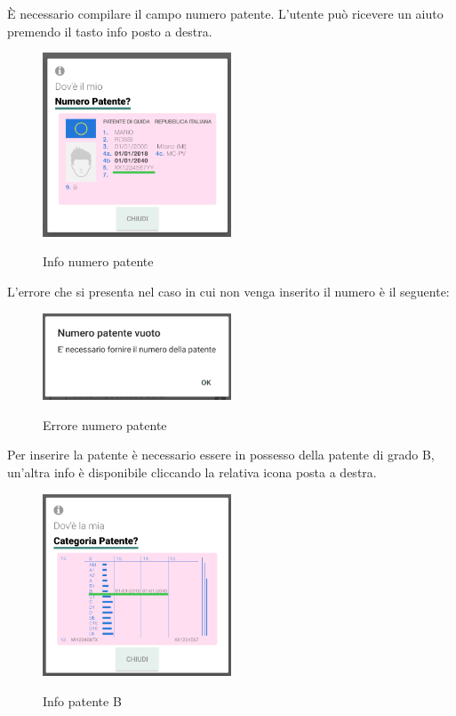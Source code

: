 \begin{itemize}
È necessario compilare il campo numero patente. L'utente può ricevere un aiuto premendo il tasto info posto a destra.
 \begin{figure}[H] 
 	\centering 
 	\includegraphics[width=0.5\textwidth]{res/images/patente1_info.png}\\
 	\caption{Info numero patente}
 	\label{patente1}
 \end{figure}
L'errore che si presenta nel caso in cui non venga inserito il numero è il seguente:
 \begin{figure}[H] 
	\centering 
	\includegraphics[width=0.5\textwidth]{res/images/patente1errore.png}\\
	\caption{Errore numero patente}
	\label{patenteerror}
\end{figure}
\pagebreak

Per inserire la patente è necessario essere in possesso della patente di grado B, un'altra info è disponibile cliccando la relativa icona posta a destra.
\begin{figure}[H] 
	\centering 
	\includegraphics[width=0.5\textwidth]{res/images/patente1_info2.png}\\
	\caption{Info patente B}
	\label{patente2}
\end{figure}
\pagebreak


\end{itemize}
